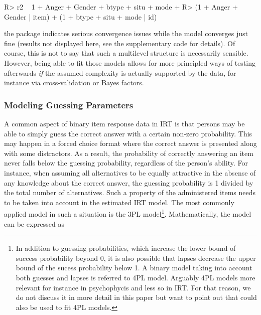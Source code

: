 \documentclass[jss]{jss}
\begin{document}
\begin{CodeChunk}

\begin{CodeInput}
R> r2 ~ 1 + Anger + Gender + btype + situ + mode + 
R>   (1 + Anger + Gender | item) + (1 + btype + situ + mode  | id)
\end{CodeInput}
\end{CodeChunk}

the  package indicates serious convergence issues while the
 model converges just fine (results not displayed here, see
the supplementary  code for details). Of course, this is not
to say that such a multilevel structure is necessarily sensible.
However, being able to fit those models allows for more principled ways
of testing afterwards \emph{if} the assumed complexity is actually
supported by the data, for instance via cross-validation or Bayes
factors.

\hypertarget{modeling-guessing-parameters}{%
\subsubsection{Modeling Guessing
Parameters}\label{modeling-guessing-parameters}}

A common aspect of binary item response data in IRT is that persons may
be able to simply guess the correct answer with a certain non-zero
probability. This may happen in a forced choice format where the correct
answer is presented along with some distractors. As a result, the
probability of correctly answering an item never falls below the
guessing probability, regardless of the person's ability. For instance,
when assuming all alternatives to be equally attractive in the absense
of any knowledge about the correct answer, the guessing probability is 1
divided by the total number of alternatives. Such a property of the
administered items needs to be taken into account in the estimated IRT
model. The most commonly applied model in such a situation is the 3PL
model\footnote{In addition to guessing probabilities, which increase the lower
bound of success probability beyond 0, it is also possible that lapses decrease
the upper bound of the sucess probability below 1. A binary model taking into
account both guesses and lapses is referred to 4PL model. Arguably 4PL models
more relevant for instance in psychophycis and less so in IRT. For that reason,
we do not discuss it in more detail in this paper but want to point out that
 could also be used to fit 4PL models.}. Mathematically, the
model can be expressed as
\end{document}
